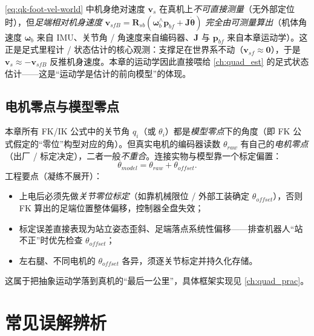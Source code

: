 \begin{insight}[要点：足端相对机身速度是状态估计的可测量]\label{ins:qk-vsfB}
\cref{eq:qk-foot-vel-world} 中机身绝对速度 $\boldsymbol{v}_s$ 在真机上\emph{不可直接测量}（无外部定位时），但\emph{足端相对机身速度} $\boldsymbol{v}_{sfB}=\mathbf{R}_{sb}(\boldsymbol{\omega}_b^{\wedge}\boldsymbol{p}_{bf}+\mathbf{J}\dot{\boldsymbol{\theta}})$ \emph{完全由可测量算出}（机体角速度 $\boldsymbol{\omega}_b$ 来自 IMU、关节角 / 角速度来自编码器、$\mathbf{J}$ 与 $\boldsymbol{p}_{bf}$ 来自本章运动学）。这正是足式里程计 / 状态估计的核心观测：支撑足在世界系不动（$\boldsymbol{v}_{sf}\approx\mathbf{0}$），于是 $\boldsymbol{v}_s\approx-\boldsymbol{v}_{sfB}$ 反推机身速度。本章的运动学因此直接喂给 \cref{ch:quad_est} 的足式状态估计——这是“运动学是估计的前向模型”的体现。
\end{insight}

\subsection{电机零点与模型零点}
\label{subsec:qk-motor-zero}

\begin{practice}\label{prac:qk-motor-zero}
本章所有 FK/IK 公式中的关节角 $q_i$（或 $\theta_i$）都是\emph{模型零点}下的角度（即 FK 公式假定的“零位”构型对应的角）。但真实电机的编码器读数 $\theta_{raw}$ 有自己的\emph{电机零点}（出厂 / 标定决定），二者一般\emph{不重合}。连接实物与模型靠一个标定偏置\cite{yu2021quadruped}：
\[
  \theta_{model}=\theta_{raw}+\theta_{offset}.
\]
工程要点（凝练不展开）：
\begin{itemize}
  \item 上电后必须先做\emph{关节零位标定}（如靠机械限位 / 外部工装确定 $\theta_{offset}$），否则 FK 算出的足端位置整体偏移，控制器全盘失效；
  \item 标定误差直接表现为站立姿态歪斜、足端落点系统性偏移——排查机器人“站不正”时优先检查 $\theta_{offset}$；
  \item 左右腿、不同电机的 $\theta_{offset}$ 各异，须逐关节标定并持久化存储。
\end{itemize}
这属于把抽象运动学落到真机的“最后一公里”，具体框架实现见 \cref{ch:quad_prac}。
\end{practice}

\section{常见误解辨析}
\label{sec:qk-misconceptions}


